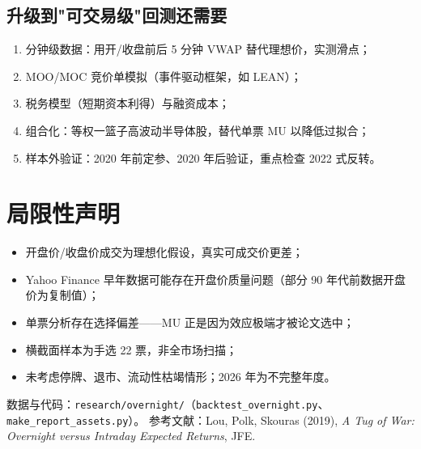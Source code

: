 \documentclass[11pt,a4paper,fontset=none]{ctexart}
\begin{document}
\subsection{升级到"可交易级"回测还需要}
\begin{enumerate}\itemsep2pt
  \item 分钟级数据：用开/收盘前后 5 分钟 VWAP 替代理想价，实测滑点；
  \item MOO/MOC 竞价单模拟（事件驱动框架，如 LEAN）；
  \item 税务模型（短期资本利得）与融资成本；
  \item 组合化：等权一篮子高波动半导体股，替代单票 MU 以降低过拟合；
  \item 样本外验证：2020 年前定参、2020 年后验证，重点检查 2022 式反转。
\end{enumerate}

\appendix
\section{局限性声明}
\begin{itemize}\itemsep0pt
  \item 开盘价/收盘价成交为理想化假设，真实可成交价更差；
  \item Yahoo Finance 早年数据可能存在开盘价质量问题（部分 90 年代前数据开盘价为复制值）；
  \item 单票分析存在选择偏差——MU 正是因为效应极端才被论文选中；
  \item 横截面样本为手选 22 票，非全市场扫描；
  \item 未考虑停牌、退市、流动性枯竭情形；2026 年为不完整年度。
\end{itemize}

\vspace{1em}
\noindent\small 数据与代码：\texttt{research/overnight/}（\texttt{backtest\_overnight.py}、\texttt{make\_report\_assets.py}）。
参考文献：Lou, Polk, Skouras (2019), \textit{A Tug of War: Overnight versus Intraday Expected Returns}, JFE.
\end{document}
